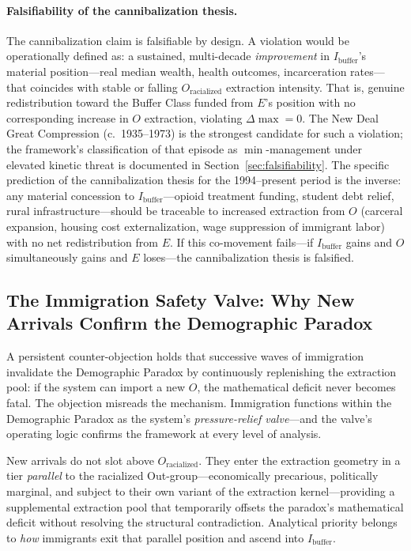 \paragraph{Falsifiability of the cannibalization thesis.}
The cannibalization claim is falsifiable by design. A violation would be operationally defined as: a sustained, multi-decade \textit{improvement} in $I_{\text{buffer}}$'s material position---real median wealth, health outcomes, incarceration rates---that coincides with stable or falling $O_{\text{racialized}}$ extraction intensity. That is, genuine redistribution toward the Buffer Class funded from $E$'s position with no corresponding increase in $O$ extraction, violating $\Delta\max = 0$. The New Deal Great Compression (c.~1935--1973) is the strongest candidate for such a violation; the framework's classification of that episode as $\min$-management under elevated kinetic threat is documented in Section~\ref{sec:falsifiability}. The specific prediction of the cannibalization thesis for the 1994--present period is the inverse: any material concession to $I_{\text{buffer}}$---opioid treatment funding, student debt relief, rural infrastructure---should be traceable to increased extraction from $O$ (carceral expansion, housing cost externalization, wage suppression of immigrant labor) with no net redistribution from $E$. If this co-movement fails---if $I_{\text{buffer}}$ gains and $O$ simultaneously gains and $E$ loses---the cannibalization thesis is falsified.

\subsection{The Immigration Safety Valve: Why New Arrivals Confirm the Demographic Paradox}
\label{subsec:immigration_safety_valve}

A persistent counter-objection holds that successive waves of immigration invalidate the Demographic Paradox by continuously replenishing the extraction pool: if the system can import a new $O$, the mathematical deficit never becomes fatal. The objection misreads the mechanism. Immigration functions within the Demographic Paradox as the system's \textit{pressure-relief valve}---and the valve's operating logic confirms the framework at every level of analysis.

New arrivals do not slot above $O_{\text{racialized}}$. They enter the extraction geometry in a tier \textit{parallel} to the racialized Out-group---economically precarious, politically marginal, and subject to their own variant of the extraction kernel---providing a supplemental extraction pool that temporarily offsets the paradox's mathematical deficit without resolving the structural contradiction. Analytical priority belongs to \textit{how} immigrants exit that parallel position and ascend into $I_{\text{buffer}}$.

